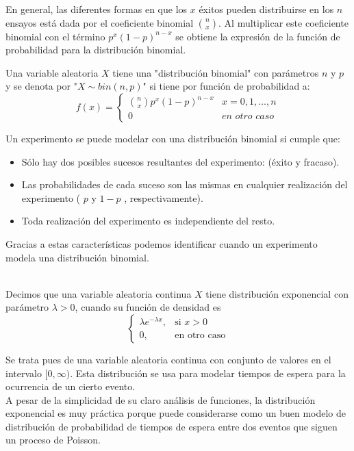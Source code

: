 En general, las diferentes formas en que los $x$ éxitos pueden distribuirse en los $n$ ensayos está dada por el coeficiente binomial $n\choose x$. Al multiplicar este coeficiente binomial con el término $p^x(1-p)^{n-x}$ se obtiene la expresión de la función de probabilidad para la distribución binomial.
\begin{Def}
    Una variable aleatoria $X$ tiene una "distribución binomial" con parámetros $n$ y $p$ y se denota por "$X\sim bin(n,p)$" si tiene por función de probabilidad a:
    $$f(x)=
    \begin{cases}
        {n \choose x} p^x(1-p)^{n-x}& x=0,1,\ldots,n\\0 & \textit{en otro caso}
    \end{cases}$$
\end{Def}
Un experimento se puede modelar con una distribución binomial si cumple que:
\begin{itemize}
    \item Sólo hay dos posibles sucesos resultantes del experimento:
    (éxito y fracaso).
    \item Las probabilidades de cada suceso son las mismas en cualquier realización del experimento ( $p$ y $1-p$ , respectivamente).
    \item Toda realización del experimento es independiente del resto.
\end{itemize}
Gracias a estas características podemos identificar cuando un experimento modela una distribución binomial.\\\\
\begin{Def}
    Decimos que una variable aleatoria continua $X$ tiene distribución exponencial con parámetro $\lambda>0$, cuando su función de densidad es
    $$\begin{cases}
        \lambda e^{-\lambda x}, & \mbox{si $x>0$}\\
        0, & \mbox{en otro caso}
    \end{cases}
    $$
\end{Def}
Se trata pues de una variable aleatoria continua con conjunto de valores en el intervalo $[0,\infty)$. Esta distribución se usa para modelar tiempos de espera para la ocurrencia de un cierto evento.\\
A pesar de la simplicidad de su claro análisis de funciones, la distribución exponencial es muy práctica porque puede considerarse como un buen modelo de distribución de probabilidad de tiempos de espera entre dos eventos que siguen un proceso de Poisson.\\
